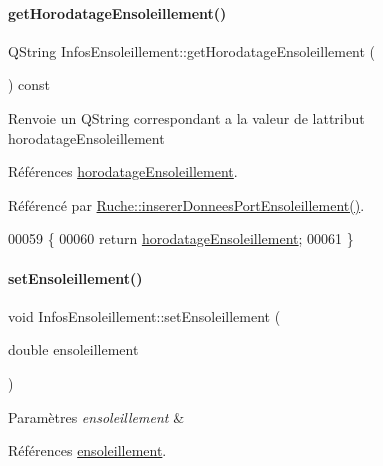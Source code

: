 \paragraph{\texorpdfstring{get\+Horodatage\+Ensoleillement()}{getHorodatageEnsoleillement()}}
{\footnotesize\ttfamily Q\+String Infos\+Ensoleillement\+::get\+Horodatage\+Ensoleillement (\begin{DoxyParamCaption}{ }\end{DoxyParamCaption}) const}

\begin{DoxyReturn}{Renvoie}
un Q\+String correspondant a la valeur de l\textquotesingle{}attribut horodatage\+Ensoleillement 
\end{DoxyReturn}


Références \hyperlink{class_infos_ensoleillement_aa2014f9d13e69e9807543737240dbfd3}{horodatage\+Ensoleillement}.



Référencé par \hyperlink{class_ruche_ad21de5f7d48195be0658f52c55f34183}{Ruche\+::inserer\+Donnees\+Port\+Ensoleillement()}.


\begin{DoxyCode}
00059 \{
00060     \textcolor{keywordflow}{return} \hyperlink{class_infos_ensoleillement_aa2014f9d13e69e9807543737240dbfd3}{horodatageEnsoleillement};
00061 \}
\end{DoxyCode}
\mbox{\label{class_infos_ensoleillement_a27c6d3d6e063e2f09fbe23a04cd89dfc}} 
\paragraph{\texorpdfstring{set\+Ensoleillement()}{setEnsoleillement()}}
{\footnotesize\ttfamily void Infos\+Ensoleillement\+::set\+Ensoleillement (\begin{DoxyParamCaption}\item[{double}]{ensoleillement }\end{DoxyParamCaption})}


\begin{DoxyParams}{Paramètres}
{\em ensoleillement} & \\
\hline
\end{DoxyParams}


Références \hyperlink{class_infos_ensoleillement_a5f3ad64743e3beeb4e64c4555ec6155c}{ensoleillement}.


